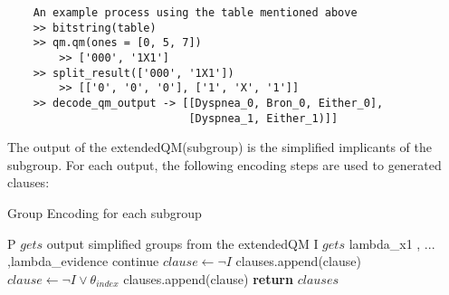     \begin{lstlisting}
    An example process using the table mentioned above
    >> bitstring(table)
    >> qm.qm(ones = [0, 5, 7])
        >> ['000', '1X1']
    >> split_result(['000', '1X1'])
        >> [['0', '0', '0'], ['1', 'X', '1']]
    >> decode_qm_output -> [[Dyspnea_0, Bron_0, Either_0],
                            [Dyspnea_1, Either_1)]]
    \end{lstlisting}
    
    \noindent The output of the extendedQM(subgroup) is the simplified implicants of the subgroup. For each output, the following encoding steps are used to generated clauses:
    
    \begin{algorithm}
    \caption{Group Encoding for each subgroup}\label{algorithm:group encoding}
    \begin{algorithmic}[1]
        \State P $gets$ output simplified groups from the extendedQM
        \State  I $gets$ lambda\_x1 , ... ,lambda\_evidence
                \State continue
            \EndIf
                \State $clause \gets \neg I$
                \State clauses.append(clause)
            \Else
                \State $clause \gets \neg I \vee \theta_{index}$
                \State clauses.append(clause)
            \EndIf
        \EndFor
    \EndFor
    \State \textbf{return} $clauses$
    \EndProcedure
    \end{algorithmic}
    \end{algorithm}

  
